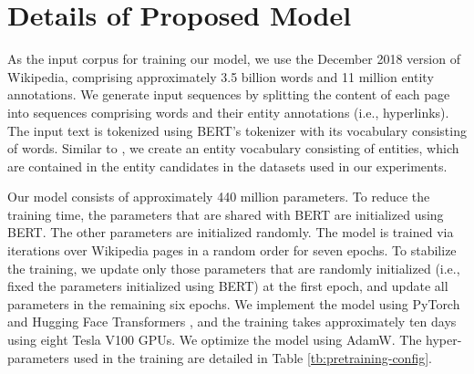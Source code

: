 \documentclass[11pt]{article}
\begin{document}
\section{Details of Proposed Model}
\label{sec:pretraining-details}
As the input corpus for training our model, we use the December 2018 version of Wikipedia, comprising approximately 3.5 billion words and 11 million entity annotations.
We generate input sequences by splitting the content of each page into sequences comprising  words and their entity annotations (i.e., hyperlinks).
The input text is tokenized using BERT's tokenizer with its vocabulary consisting of  words.
Similar to , we create an entity vocabulary consisting of  entities, which are contained in the entity candidates in the datasets used in our experiments.

Our model consists of approximately 440 million parameters.
To reduce the training time, the parameters that are shared with BERT are initialized using BERT.
The other parameters are initialized randomly.
The model is trained via iterations over Wikipedia pages in a random order for seven epochs.
To stabilize the training, we update only those parameters that are randomly initialized (i.e., fixed the parameters initialized using BERT) at the first epoch, and update all parameters in the remaining six epochs.
We implement the model using PyTorch \cite{NEURIPS2019_bdbca288} and Hugging Face Transformers \cite{wolf-etal-2020-transformers}, and the training takes approximately ten days using eight Tesla V100 GPUs.
We optimize the model using AdamW.
The hyper-parameters used in the training are detailed in Table  \ref{tb:pretraining-config}.
\end{document}
